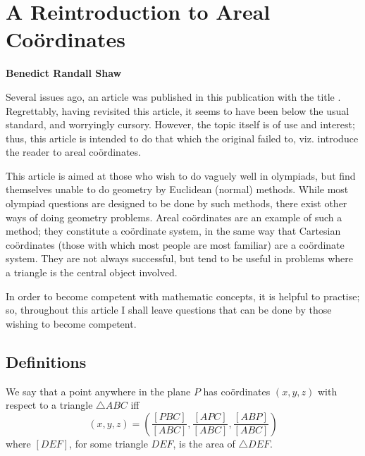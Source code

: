 \chapter{A Reintroduction to Areal Co\"ordinates}

\textbf{Benedict Randall Shaw}

\begin{multicols}{2}

Several issues ago, an article was published in this publication with the title . Regrettably, having revisited this article, it seems to have been below the usual standard, and worryingly cursory. However, the topic itself is of use and interest; thus, this article is intended to do that which the original failed to, viz. introduce the reader to areal co\"ordinates.

This article is aimed at those who wish to do vaguely well in olympiads, but find themselves unable to do geometry by Euclidean (normal) methods. While most olympiad questions are designed to be done by such methods, there exist other ways of doing geometry problems. Areal co\"ordinates are an example of such a method; they constitute a co\"ordinate system, in the same way that Cartesian co\"ordinates (those with which most people are most familiar) are a co\"ordinate system. They are not always successful, but tend to be useful in problems where a triangle is the central object involved.

In order to become competent with mathematic concepts, it is helpful to practise; so, throughout this article I shall leave questions that can be done by those wishing to become competent.


\end{multicols}
\section{Definitions}
\begin{multicols}{2}

We say that a point anywhere in the plane \(P\) has co\"ordinates \((x,y,z)\) with respect to a triangle \(\triangle{}ABC\) iff \[(x,y,z)=\left(\frac{[PBC]}{[ABC]},\frac{[APC]}{[ABC]},\frac{[ABP]}{[ABC]}\right)\] where \([DEF]\), for some triangle \(DEF\), is the area of \(\triangle{}DEF\).

\end{multicols}

